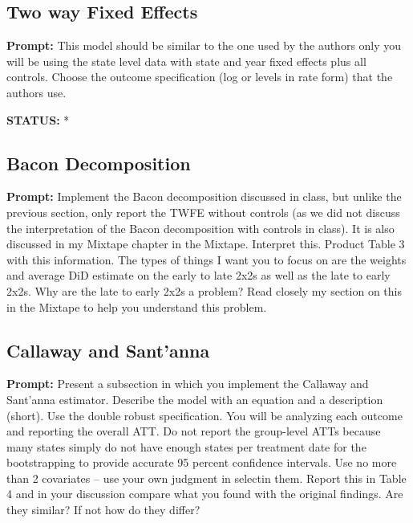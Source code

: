 \documentclass{article}
\begin{document}
	\subsection{Two way Fixed Effects}
	
	\textbf{Prompt: } This model should be similar to the one used by the authors only you will be using the state level data with state and year fixed effects plus all controls.  Choose the outcome specification (log or levels in rate form) that the authors use.
	
	\textbf{STATUS:}
	* 
	
	
	
	
	
	
	
	
	\subsection{Bacon Decomposition}
	
	\textbf{Prompt: } Implement the Bacon decomposition discussed in class, but unlike the previous section, only report the TWFE without controls (as we did not discuss the interpretation of the Bacon decomposition with controls in class).  It is also discussed in my Mixtape chapter in the Mixtape.  Interpret this.  Product Table 3 with this information.  The types of things I want you to focus on are the weights and average DiD estimate on the early to late 2x2s as well as the late to early 2x2s. Why are the late to early 2x2s a problem?  Read closely my section on this in the Mixtape to help you understand this problem.  
	
	\subsection{Callaway and Sant'anna}
	
	\textbf{Prompt: } Present a subsection in which you implement the Callaway and Sant’anna estimator.  Describe the model with an equation and a description (short). Use the double robust specification. You will be analyzing each outcome and reporting the overall ATT.  Do not report the group-level ATTs because many states simply do not have enough states per treatment date for the bootstrapping to provide accurate 95 percent confidence intervals.  Use no more than 2 covariates – use your own judgment in selectin them. Report this in Table 4 and in your discussion compare what you found with the original findings.  Are they similar?  If not how do they differ?
	
\end{document}
